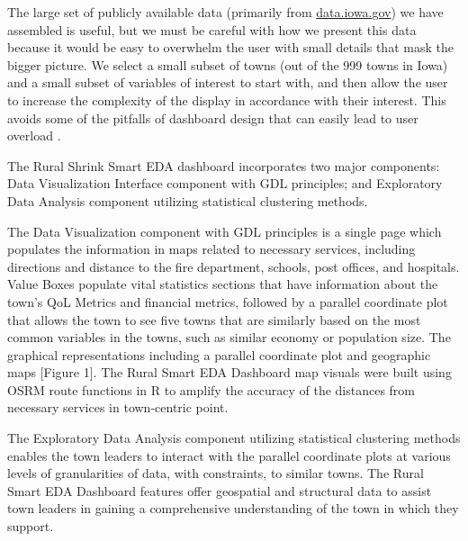 \documentclass[10pt]{article}\usepackage[]{graphicx}\usepackage[]{color}
\begin{document}
The large set of publicly available data (primarily from \url{data.iowa.gov}) we have assembled is useful, but we must be careful with how we present this data because it would be easy to overwhelm the user with small details that mask the bigger picture. We select a small subset of towns (out of the 999 towns in Iowa) and a small subset of variables of interest to start with, and then allow the user to increase the complexity of the display in accordance with their interest. This avoids some of the pitfalls of dashboard design that can easily lead to user overload \cite{few}.


The Rural Shrink Smart EDA dashboard incorporates two major components: Data Visualization Interface component with GDL principles; and Exploratory Data Analysis component utilizing statistical clustering methods.

The Data Visualization component with GDL principles is a single page which populates the information in maps related to necessary services, including directions and distance to the fire department, schools, post offices, and hospitals. Value Boxes populate vital statistics sections that have information about the town's QoL Metrics and financial metrics, followed by a parallel coordinate plot that allows the town to see five towns that are similarly based on the most common variables in the towns, such as similar economy or population size. The graphical representations including a parallel coordinate plot and geographic maps [Figure 1]. The Rural Smart EDA Dashboard map visuals were built using OSRM route functions in R to amplify the accuracy of the distances from necessary services in town-centric point.

The Exploratory Data Analysis component utilizing statistical clustering methods enables the town leaders to interact with the parallel coordinate plots at various levels of granularities of data, with constraints, to similar towns. The Rural Smart EDA Dashboard features offer geospatial and structural data to assist town leaders in gaining a comprehensive understanding of the town in which they support. 
\end{document}
